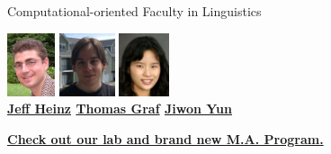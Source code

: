 \documentclass[xcolor={usenames,svgnames,x11names,dvipsnames,table}]{beamer}
\begin{document}
\begin{frame}{Computational-oriented Faculty in Linguistics}

    \begin{center}
           \includegraphics[height=5em]{./img/heinz_crop}
        \hspace{4em}
         \includegraphics[height=5em]{./img/thomas_graf}
            \hspace{4em}
            \includegraphics[height=5em]{./img/jiwon_yun}\\
                \noindent
        \footnotesize\bfseries
                \href{http://jeffreyheinz.net}{Jeff Heinz}  \hspace{4em} \href{http://thomasgraf.net}{Thomas Graf}  \hspace{4em} \href{https://linguistics.stonybrook.edu/jiwonyun/index.html}{Jiwon Yun} \\          
    \end{center}
   
  \pause
  \vspace{1cm}
  \begin{center} 
   \alert{\textbf{\href{http://compling.stonybrook.edu/}{Check out our lab and brand new M.A. Program.}}}
    \end{center}
\end{frame}
\end{document}
